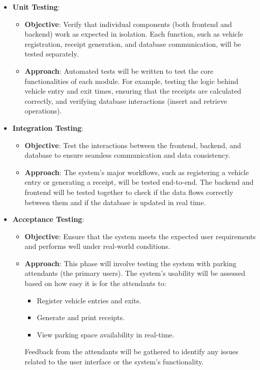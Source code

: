\begin{itemize}
    \item \textbf{Unit Testing}: 
    \begin{itemize}
        \item \textbf{Objective}: Verify that individual components (both frontend and backend) work as expected in isolation. Each function, such as vehicle registration, receipt generation, and database communication, will be tested separately.
        \item \textbf{Approach}: Automated tests will be written to test the core functionalities of each module. For example, testing the logic behind vehicle entry and exit times, ensuring that the receipts are calculated correctly, and verifying database interactions (insert and retrieve operations).
    \end{itemize}
    
    \item \textbf{Integration Testing}: 
    \begin{itemize}
        \item \textbf{Objective}: Test the interactions between the frontend, backend, and database to ensure seamless communication and data consistency.
        \item \textbf{Approach}: The system's major workflows, such as registering a vehicle entry or generating a receipt, will be tested end-to-end. The backend and frontend will be tested together to check if the data flows correctly between them and if the database is updated in real time.
    \end{itemize}

    \item \textbf{Acceptance Testing}:
    \begin{itemize}
        \item \textbf{Objective}: Ensure that the system meets the expected user requirements and performs well under real-world conditions.
        \item \textbf{Approach}: This phase will involve testing the system with parking attendants (the primary users). The system’s usability will be assessed based on how easy it is for the attendants to:
        \begin{itemize}
            \item Register vehicle entries and exits.
            \item Generate and print receipts.
            \item View parking space availability in real-time.
        \end{itemize}
        Feedback from the attendants will be gathered to identify any issues related to the user interface or the system’s functionality.
    \end{itemize}
\end{itemize}

